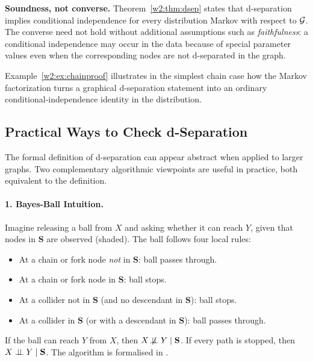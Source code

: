 \documentclass[master.tex]{subfiles}
\begin{document}
\begin{remark}
\textbf{Soundness, not converse.}
Theorem~\ref{w2:thm:dsep} states that d-separation implies conditional
independence for every distribution Markov with respect to $\mathcal{G}$.
The converse need not hold without additional assumptions such as
\emph{faithfulness}: a conditional independence may occur in the data
because of special parameter values even when the corresponding nodes
are not d-separated in the graph.
\end{remark}

Example~\ref{w2:ex:chainproof} illustrates in the simplest chain case how
the Markov factorization turns a graphical d-separation statement into an
ordinary conditional-independence identity in the distribution.

\subsection{Practical Ways to Check d-Separation}

The formal definition of d-separation can appear abstract when applied to
larger graphs.  Two complementary algorithmic viewpoints are useful in
practice, both equivalent to the definition.

\paragraph{1. Bayes-Ball Intuition.}
Imagine releasing a ball from $X$ and asking whether it can reach $Y$,
given that nodes in $\mathbf{S}$ are observed (shaded).
The ball follows four local rules:
\begin{itemize}
  \item At a chain or fork node \emph{not} in $\mathbf{S}$: ball passes
        through.
  \item At a chain or fork node in $\mathbf{S}$: ball stops.
  \item At a collider not in $\mathbf{S}$ (and no descendant in
        $\mathbf{S}$): ball stops.
  \item At a collider in $\mathbf{S}$ (or with a descendant in
        $\mathbf{S}$): ball passes through.
\end{itemize}
If the ball can reach $Y$ from $X$, then $X \not\!\perp\!\!\!\perp Y \mid
\mathbf{S}$.  If every path is stopped, then $X \perp\!\!\!\perp Y \mid
\mathbf{S}$.  The algorithm is formalised in \citet{shachter1998bayesball}.
\end{document}
